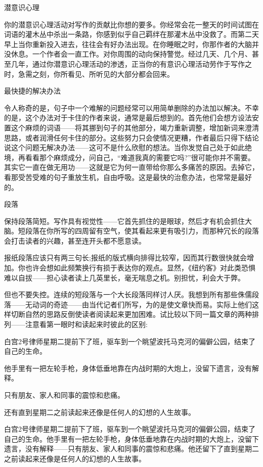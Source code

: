 潜意识心理

你的潜意识心理活动对写作的贡献比你想的要多。你经常会花一整天的时间试图在词语的灌木丛中杀出一条路，你感到似乎自己羁绊在那灌木丛中没救了。而第二天早上当你重新投入进去，往往会有好办法出现。在你睡眠之时，你那作者的大脑并没休息。一个作者会一直工作。对你周围的动向保持警觉。经过几天、几个月、甚至几年，通过你潜意识心理活动的渗透，正当你的有意识心理活动劳作于写作之时，急需之刻，你所看见、所听见的大部分都会回来。

最快捷的解决办法

令人称奇的是，句子中一个难解的问题经常可以用简单删除的办法加以解决。不幸的是，这个办法对于卡住的作者来说，通常是最后想到的。首先他们会想方设法安置这个麻烦的词语——将其挪到句子的其他部分，竭力重新调整，增加新词来澄清思路，或者润滑任何卡住的部分。这些努力只会使情况更糟，作者最后只得下结论说这个问题无解决办法——这可不是什么欣慰的想法。当你发觉自己处于如此绝境，再看看那个麻烦成分，问自己，“难道我真的需要它吗?”很可能你并不需要。其实它一直在做无用功——这就是它为何一直带给你那么多痛苦的原因。去掉它，看那受苦受难的句子重放生机，自由呼吸。这是最快的治愈办法，也常常是最好的。

段落

保持段落简短。写作具有视觉性——它首先抓住的是眼球，然后才有机会抓住大脑。短段落在你所写的四周留有空气，使其看起来更有吸引力，而那种冗长的段落会打击读者的兴趣，甚至连开头都不愿意读。

报纸段落应该只有两三句长;报纸的版式横向排得比较窄，因而其行数很快就会增加。你也许会想如此频繁换行有损于表达你的观点。显然，《纽约客》对此类恐惧难以自拔——担心读者读上几英里长，毫无喘息之机。别担忧，利会大于弊。

但也不要失控。连续的短段落与一个大长段落同样讨人厌。我想到所有那些侏儒段落——无动词的奇迹——由当代记者们所写，为的是使文章快而易。实际上他们这样切断自然的思路反倒使读者阅读起来更加困难。试比较以下同一篇文章的两种排列——注意看第一眼时和读起来时彼此的区别:


白宫2号律师星期二提前下了班，驱车到一个眺望波托马克河的偏僻公园，结束了自己的生命。

他手里有一把左轮手枪，身体低垂地靠在内战时期的大炮上，没留下遗言，没有解释。

只有朋友、家人和同事的震惊和悲痛。

还有直到星期二之前读起来还像是任何人的幻想的人生故事。

白宫2号律师星期二提前下了班，驱车到一个眺望波托马克河的偏僻公园，结束了自己的生命。他手里有一把左轮手枪，身体低垂地靠在内战时期的大炮上，没留下遗言，没有解释——只有朋友、家人和同事的震惊和悲痛。他还留下了直到星期二之前读起来还像是任何人的幻想的人生故事。

